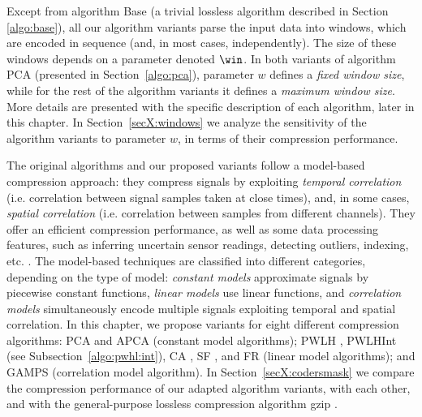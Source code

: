 \spaceForThisSection
Except from algorithm Base (a trivial lossless algorithm described in Section \ref{algo:base}), all our algorithm variants parse the input data into windows, which are encoded in sequence (and, in most cases, independently). The size of these windows depends on a parameter denoted $\win$. In both variants of algorithm PCA (presented in Section~\ref{algo:pca}), parameter $w$ defines a \textit{fixed window size}, while for the rest of the algorithm variants it defines a \textit{maximum window size}. More details are presented with the specific description of each algorithm, later in this chapter. In Section~\ref{secX:windows} we analyze the sensitivity of the algorithm variants to parameter $w$, in terms of their compression performance.


\spaceForThisSection
The original algorithms and our proposed variants follow a model-based compression approach: they compress signals by exploiting \textit{temporal correlation} (i.e. correlation between signal samples taken at close times), and, in some cases, \textit{spatial correlation} (i.e. correlation between samples from different channels). They offer an efficient compression performance, as well as some data processing features, such as inferring uncertain sensor readings, detecting outliers, indexing, etc. \cite{AnEva2013}. The model-based techniques are classified into different categories, depending on the type of model: \textit{constant models} approximate signals by piecewise constant functions, \textit{linear models} use linear functions, and \textit{correlation models} simultaneously encode multiple signals exploiting temporal and spatial correlation. In this chapter, we propose variants for eight different compression algorithms: PCA \cite{coder:pca} and APCA \cite{coder:apca} (constant model algorithms); PWLH \cite{coder:pwlh}, PWLHInt (see Subsection~\ref{algo:pwhl:int}), CA \cite{coder:ca}, SF \cite{coder:sf}, and FR \cite{coder:fr} (linear model algorithms); and GAMPS \cite{coder:gamps} (correlation model algorithm). In Section~\ref{secX:codersmask} we compare the compression performance of our adapted algorithm variants, with each other, and with the general-purpose lossless compression algorithm gzip \cite{gzip}.


